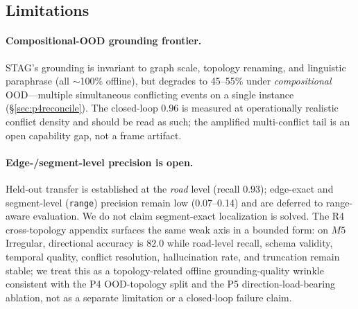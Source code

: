 \subsection{Limitations}
\label{sec:limitations}

\paragraph{Compositional-OOD grounding frontier.}
STAG's grounding is invariant to graph scale, topology renaming, and linguistic paraphrase (all
$\sim$100\% offline), but degrades to 45--55\% under \emph{compositional} OOD---multiple simultaneous
conflicting events on a single instance (\S\ref{sec:p4reconcile}). The closed-loop $0.96$ is measured at
operationally realistic conflict density and should be read as such; the amplified multi-conflict tail is
an open capability gap, not a frame artifact.

\paragraph{Edge-/segment-level precision is open.}
Held-out transfer is established at the \emph{road} level (recall $0.93$); edge-exact and segment-level
(\texttt{range}) precision remain low (0.07--0.14) and are deferred to range-aware evaluation. We do not
claim segment-exact localization is solved. The R4 cross-topology appendix surfaces the same weak axis in
a bounded form: on $M5$ Irregular, directional accuracy is $82.0$ while road-level recall, schema
validity, temporal quality, conflict resolution, hallucination rate, and truncation remain stable; we
treat this as a topology-related offline grounding-quality wrinkle consistent with the P4 OOD-topology
split and the P5 direction-load-bearing ablation, not as a separate limitation or a closed-loop failure
claim.

